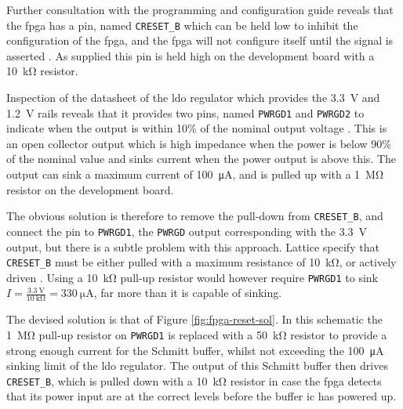 Further consultation with the programming and configuration guide reveals that the \gls{fpga} has a pin, named \texttt{CRESET\_B} which can be held low to inhibit the configuration of the \gls{fpga}, and the \gls{fpga} will not configure itself until the signal is asserted \cite[p.4]{lattice2016}. As supplied this pin is held high on the development board with a \SI{10}{\kilo\ohm} resistor.

Inspection of the datasheet of the \gls{ldo} regulator which provides the \SI{3.3}{\volt} and \SI{1.2}{\volt} rails reveals that it provides two pins, named \texttt{PWRGD1} and \texttt{PWRGD2} to indicate when the output is within 10\% of the nominal output voltage \cite[p.11]{linear2013}. This is an open collector output which is high impedance when the power is below 90\% of the nominal value and sinks current when the power output is above this. The output can sink a maximum current of \SI{100}{\micro\ampere}, and is pulled up with a \SI{1}{\mega\ohm} resistor on the development board.

The obvious solution is therefore to remove the pull-down from \texttt{CRESET\_B}, and connect the pin to \texttt{PWRGD1}, the \texttt{PWRGD} output corresponding with the \SI{3.3}{\volt} output, but there is a subtle problem with this approach. Lattice specify that \texttt{CRESET\_B} must be either pulled with a maximum resistance of \SI{10}{\kilo\ohm}, or actively driven \cite[p4-1]{lattice2017a}. Using a \SI{10}{\kilo\ohm} pull-up resistor would however require \texttt{PWRGD1} to sink $I=\frac{\SI{3.3}{\volt}}{\SI{10}{\kilo\ohm}}= \SI{330}{\micro\ampere}$, far more than it is capable of sinking.

The devised solution is that of Figure \ref{fig:fpga-reset-sol}. In this schematic the \SI{1}{\mega\ohm} pull-up resistor on \texttt{PWRGD1} is replaced with a \SI{50}{\kilo\ohm} resistor to provide a strong enough current for the Schmitt buffer, whilst not exceeding the \SI{100}{\micro\ampere} sinking limit of the \gls{ldo} regulator. The output of this Schmitt buffer then drives \texttt{CRESET\_B}, which is pulled down with a \SI{10}{\kilo\ohm} resistor in case the \gls{fpga} detects that its power input are at the correct levels before the buffer \gls{ic} has powered up.


